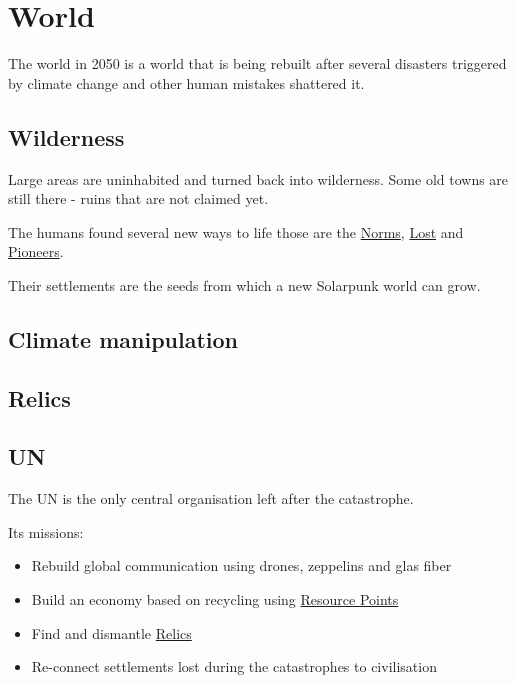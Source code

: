 \chapter{World}

The world in 2050 is a world that is being rebuilt after several disasters triggered by climate change and other human mistakes shattered it.

\section{Wilderness}

Large areas are uninhabited and turned back into wilderness. Some old towns are still there - ruins that are not claimed yet.

The humans found several new ways to life those are the \hyperref[sec: Norms]{Norms}, \hyperref[sec: Lost]{Lost} and \hyperref[sec: Pioneers]{Pioneers}.

Their settlements are the seeds from which a new Solarpunk world can grow.

\section{Climate manipulation}

\section{Relics}
\label{sec: Relic}

\section{UN}
\label{sec: UN}

The UN is the only central organisation left after the catastrophe.

Its missions:

\begin{itemize}
    \item Rebuild global communication using drones, zeppelins and glas fiber
    \item Build an economy based on recycling using \hyperref[sec:Resource Points]{Resource Points}
    \item Find and dismantle \hyperref[sec: Relic]{Relics}
    \item Re-connect settlements lost during the catastrophes to civilisation
\end{itemize}

